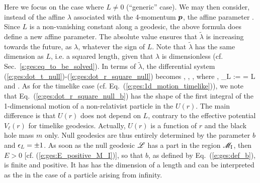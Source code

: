 Here we focus on the case where $L\not= 0$ (``generic'' case). We may then
consider, instead of the affine $\lambda$ associated with the 4-momentum $\bm{p}$,
the affine parameter
\be
   .
\ee
Since $L$ is a non-vanishing constant along a geodesic, the above formula
does define a new affine parameter. The absolute value ensures that
$\tilde{\lambda}$ is increasing towards the future, as $\lambda$, whatever
the sign of $L$. Note that $\tilde{\lambda}$ has the same
dimension as $L$, i.e. a squared length, given that $\lambda$ is dimensionless
(cf. Sec.~\ref{s:ges:eq_to_be_solved}).
In terms of $\tilde{\lambda}$,
the differential system (\ref{e:ges:dot_t_null})-(\ref{e:ges:dot_r_square_null})
becomes
\be \label{e:ges:dot_t_null_b}
   ,
\ee
\be \label{e:ges:dot_ph_null_b}
    ,
\ee
\be \label{e:ges:dot_r_square_null_b}
   ,
\ee
where
\be \label{e:ges:def_b}
     ,
\ee
\be \label{e:gis:def_epsilon_L}
    \eps_L :=  =  L
\ee
and
\be \label{e:ges:eff_pot_null}
    .
\ee
As for the timelike case (cf. Eq.~(\ref{e:ges:1d_motion_timelike})),
we note that Eq.~(\ref{e:ges:dot_r_square_null_b})
has the shape of the first integral of the
1-dimensional motion of a non-relativist particle in the
$U(r)$. The main difference is that $U(r)$ does not depend on $L$, contrary
to the effective potential $V_\ell(r)$ for timelike geodesics. Actually,
$U(r)$ is a function of $r$ and the black hole mass $m$ only.
Null geodesics are thus entirely determined by the parameter
$b$ and $\epsilon_L = \pm 1$.
As soon as the null geodesic $\mathscr{L}$ has a part in the
region $\mathscr{M}_{\rm I}$, then $E>0$ [cf. (\ref{e:ges:E_positive_M_I})], so that
$b$, as defined by Eq.~(\ref{e:ges:def_b}), is finite and positive. It has
has the dimension of a length
and can be interpreted as the
 in the case of a
particle arising from infinity.
